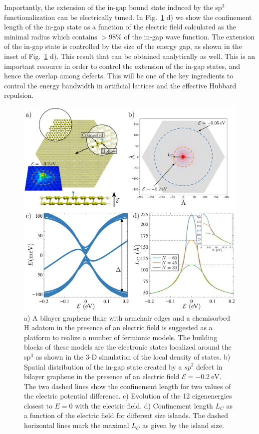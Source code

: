 Importantly, the extension of the in-gap bound state induced by the sp$^3$ functionalization can be electrically tuned. In Fig.~\ref{figure1} d) we show the confinement length of the in-gap state as a function of the electric field calculated as the minimal radius which contains $> 98\%$ of the in-gap wave function.
The extension of the in-gap state is controlled by the size of the energy gap, as shown in the inset of Fig.~\ref{figure1} d). This result that can be obtained analytically as well\cite{Nilsson2007}. This is an important resource in order to control the extension of the in-gap states, and hence the overlap among defects. This will be one of the key ingredients to control the energy bandwidth in artificial lattices and the effective Hubbard repulsion.


\begin{figure}[h!]
\centering
\includegraphics{designer/figures/fig1.pdf}
\vspace{-5pt}
\caption{a) A bilayer graphene flake with armchair edges and a chemisorbed H adatom in the presence of an electric field is suggested as a platform to realize a number of fermionic models. The building blocks of these models are the electronic states localized around the sp$^3$ as shown in the 3-D simulation of the local density of states. b) Spatial distribution of the in-gap state created by a $sp^3$ defect in bilayer graphene in the presence of an electric field $\mathcal{E}=\SI{-0.2}{\eV}$. The two dashed lines show the confinement length for two values of the electric potential difference. c) Evolution of the 12 eigenenergies closest to $E=0$ with the electric field. d) Confinement length $L_C$ as a function of the electric field for different size islands. The dashed horizontal lines mark the maximal $L_C$ as given by the island size.}
\label{figure1}
\end{figure}


